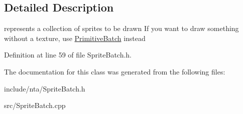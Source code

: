 \subsection{Detailed Description}
represents a collection of sprites to be drawn If you want to draw something without a texture, use \hyperlink{classnta_1_1PrimitiveBatch}{Primitive\+Batch} instead 

Definition at line 59 of file Sprite\+Batch.\+h.



The documentation for this class was generated from the following files\+:\begin{DoxyCompactItemize}
\item 
include/nta/Sprite\+Batch.\+h\item 
src/Sprite\+Batch.\+cpp\end{DoxyCompactItemize}
